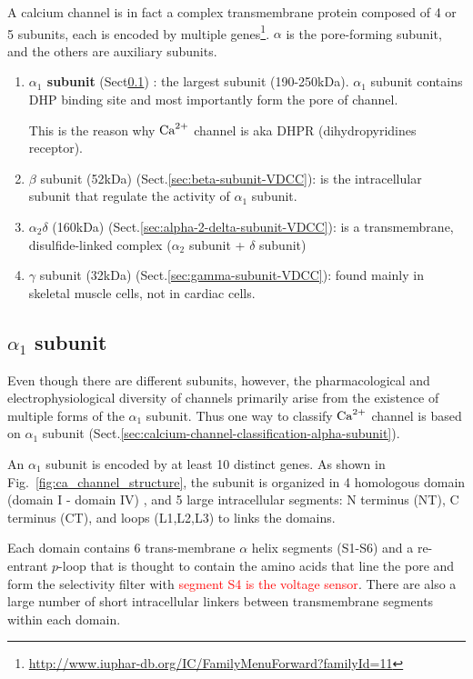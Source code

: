 A calcium channel is in fact a complex transmembrane protein composed of 4 or 5
subunits, each is encoded by multiple
genes\footnote{\url{http://www.iuphar-db.org/IC/FamilyMenuForward?familyId=11}}.
$\alpha$ is the pore-forming subunit, and the others are auxiliary subunits.

\begin{enumerate}
\item {\bf $\alpha_1$ subunit} (Sect\ref{sec:alpha-1-subunit-VDCC}) : the largest subunit
  (190-250kDa). $\alpha_1$ subunit contains DHP binding site and most
  importantly form the pore of  channel.

This is the reason why ${\text{Ca}^{2+}}$ channel is aka DHPR (dihydropyridines receptor).

\item $\beta$ subunit (52kDa) (Sect.\ref{sec:beta-subunit-VDCC}): is the
intracellular subunit that regulate the activity of $\alpha_1$ subunit.

\item $\alpha_2\delta$ (160kDa) (Sect.\ref{sec:alpha-2-delta-subunit-VDCC}): is a transmembrane,
disulfide-linked complex ($\alpha_2$ subunit + $\delta$ subunit)

\item $\gamma$ subunit (32kDa) (Sect.\ref{sec:gamma-subunit-VDCC}): found mainly
in skeletal muscle cells, not in cardiac cells.
\end{enumerate}

\subsection[alpha-1 subunit]{$\alpha_1$ subunit}
\label{sec:alpha-1-subunit-VDCC}

Even though there are different subunits, however, the pharmacological and
electrophysiological diversity of  channels primarily arise from the
existence of multiple forms of the $\alpha_1$ subunit. Thus one way to classify
${\text{Ca}^{2+}}$ channel is based on $\alpha_1$ subunit
(Sect.\ref{sec:calcium-channel-classification-alpha-subunit}).

An $\alpha_1$ subunit is
encoded by at least 10 distinct genes.
As shown in Fig.~\ref{fig:ca_channel_structure}, 
the subunit is organized in 4 homologous domain
(domain I - domain IV) , and 5 large intracellular
segments: N terminus (NT), C terminus (CT), and loops (L1,L2,L3) to links the
domains. 

Each domain contains 6 trans-membrane $\alpha$ helix segments (S1-S6) and a
re-entrant $p$-loop that is thought to contain the amino acids that line the
pore and form the selectivity filter \citep{catterall2005iup} with
\textcolor{red}{segment S4 is the voltage sensor}.
There are also a large number of short intracellular linkers between
transmembrane segments within each domain.

